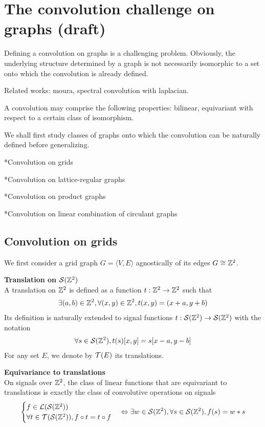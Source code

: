\section{The convolution challenge on graphs (draft)}

Defining a convolution on graphs is a challenging problem. Obviously, the underlying structure determined by a graph is not necessarily isomorphic to a set onto which the convolution is already defined. 

Related works: moura, spectral convolution with laplacian.

A convolution may comprise the following properties: bilinear, equivariant with respect to a certain class of isomorphism.

We shall first study classes of graphs onto which the convolution can be naturally defined before generalizing.

*Convolution on grids

*Convolution on lattice-regular graphs

*Convolution on product graphs

*Convolution on linear combination of circulant graphs

\subsection{Convolution on grids}

We first consider a grid graph $G = \langle V,E \rangle$ agnostically of its edges \ie $G \cong \mathbb{Z}^2$.

\begin{definition}\textbf{Translation on $\mathcal{S}(\mathbb{Z}^2)$}\\
A translation on $\mathbb{Z}^2$ is defined as a function $t: \mathbb{Z}^2 \rightarrow \mathbb{Z}^2$ such that
\begin{gather*}
\exists (a,b) \in \mathbb{Z}^2, \forall (x,y) \in \mathbb{Z}^2, t(x,y) = (x+a,y+b)
\end{gather*}
Its definition is naturally extended to signal functions $t: \mathcal{S}(\mathbb{Z}^2) \rightarrow \mathcal{S}(\mathbb{Z}^2)$ with the notation 
\begin{gather*}
\forall s \in \mathcal{S}(\mathbb{Z}^2), t(s)[x,y] = s[x-a, y-b]
\end{gather*}
For any set $E$, we denote by $\mathcal{T}(E)$ its translations.
\end{definition}

\begin{proposition}\textbf{Equivariance to translations}\\
On signals over $\mathbb{Z}^2$, the class of linear functions that are equivariant to translations is exactly the class of convolutive operations on signals \ie
\begin{gather*}
\begin{cases}
 f \in \mathcal{L}(\mathcal{S}(\mathbb{Z}^2))\\
 \forall t \in \mathcal{T}(\mathcal{S}(\mathbb{Z}^2)), f \circ t = t \circ f
\end{cases}
 \Leftrightarrow \exists w \in \mathcal{S}(\mathbb{Z}^2), \forall s \in \mathcal{S}(\mathbb{Z}^2), f(s) = w \ast s
\end{gather*}
\end{proposition}


